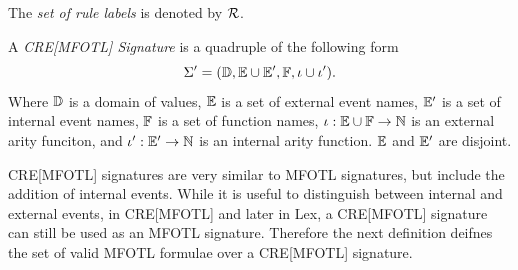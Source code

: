 \begin{definition}
    \label{def:cre-rule-labels}
    The \emph{set of rule labels} is denoted by $\mathcal{R}$.
\end{definition}

\begin{definition}
    \label{def:cre-mfotl-signature}
    A \emph{CRE[MFOTL] Signature} is a quadruple of the following form
    $$
    \Sigma' = ( \mathbb{D}, 
    \mathbb{E} \cup \mathbb{E}',
    \mathbb{F}, \iota \cup \iota'
    ).
    $$
    Where $\mathbb{D}$ is a domain of values,
    $\mathbb{E}$ is a set of external event names,
    $\mathbb{E}'$ is a set of internal event names,
    $\mathbb{F}$ is a set of function names,
    $\iota: \mathbb{E} \cup \mathbb{F} \to \mathbb{N}$ is an external arity funciton,
    and $\iota': \mathbb{E}' \to \mathbb{N}$ is an internal arity function.
    $\mathbb{E}$ and $\mathbb{E}'$ are disjoint.
\end{definition}
CRE[MFOTL] signatures are very similar to MFOTL signatures, but include
the addition of internal events.
While it is useful to distinguish between internal and external events,
in CRE[MFOTL] and later in Lex, a CRE[MFOTL] signature can still be used
as an MFOTL signature.
Therefore the next definition deifnes the set of valid MFOTL
formulae over a CRE[MFOTL] signature.


